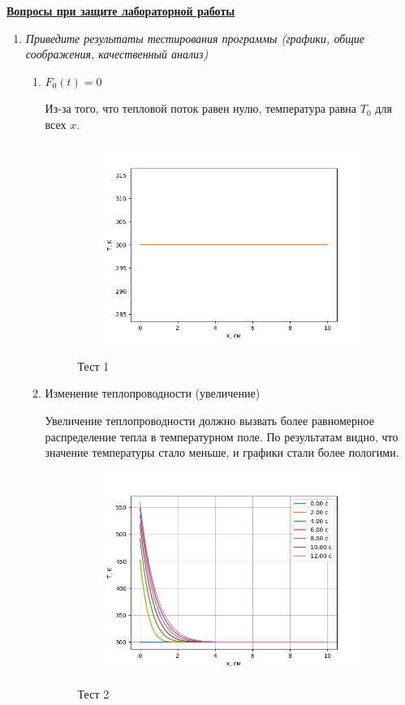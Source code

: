 \underline{\textbf{Вопросы при защите лабораторной работы}}\\
\begin{enumerate}
\item \textit{Приведите результаты тестирования программы (графики, общие соображения, качественный анализ)}

\begin{enumerate}
	\item $F_0(t) = 0$  
	
	Из-за того, что тепловой поток равен нулю, температура равна $T_0$ для всех $x$.
	\begin{figure}[h]
	\begin{center}
		{\includegraphics[height=6.5cm, width = 10cm]{../pictures/Figure_3}}
		\caption{Тест 1}
	\end{center}
	\end{figure}

	\item Изменение теплопроводности (увеличение)
	
	Увеличение теплопроводности должно вызвать более равномерное распределение тепла в температурном поле. По результатам видно, что значение температуры стало меньше, и графики стали более пологими.
	\begin{figure}[h]
		\begin{center}
			{\includegraphics[height=6.5cm, width = 10cm]{../pictures/Figure_5}}
			\caption{Тест 2}
		\end{center}
	\end{figure}


\end{enumerate}
\end{enumerate}
